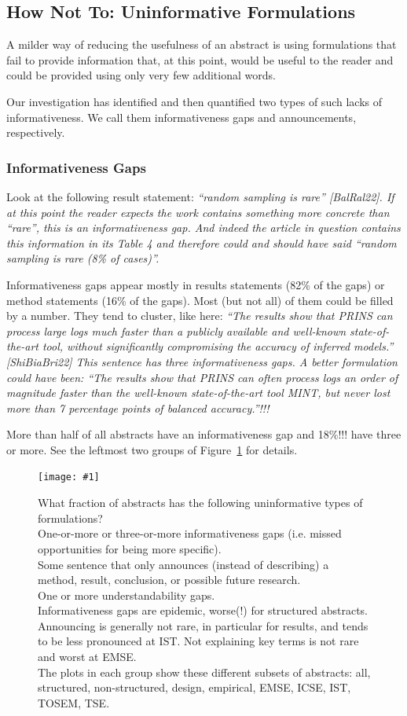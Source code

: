 \documentclass[10pt,journal,compsoc]{IEEEtran}
\newcommand{\Plotwide}[2]{%
	\begin{figure}[tbp]%
		\centering\texttt{[image: \#1]}%
		\vspace{-4mm}\caption{#2}\label{#1}%
    \end{figure}}
\newcommand{\Art}[1]{\bgroup[#1]\egroup} %
\newcommand{\Quote}[1]{\bgroup\itshape ``#1''\egroup}  %
\newcommand{\Pseudoquote}[1]{\bgroup\itshape ``#1''\egroup}  %
\newcommand{\Describegroups}{The plots in each group show these different subsets of abstracts:
	all, structured, non-structured, design, empirical, EMSE, ICSE, IST, TOSEM, TSE.}
\begin{document}
\subsection{How Not To: Uninformative Formulations}

A milder way of reducing the usefulness of an abstract is using formulations that
fail to provide information that, at this point, would be useful to the reader and
could be provided using only very few additional words.

Our investigation has identified and then quantified two types
of such lacks of informativeness.
We call them informativeness gaps and announcements, respectively.

\subsubsection{Informativeness Gaps}

Look at the following result statement:
\Quote{random sampling is rare} \Art{BalRal22}. %
If at this point the reader expects the work contains something more
concrete than \Quote{rare}, this is an informativeness gap.
And indeed the article in question contains this information in its
Table 4 and therefore could and should have said
\Pseudoquote{random sampling is rare (8\% of cases)}.

Informativeness gaps appear mostly in results statements (82\% of the gaps)
or method statements (16\% of the gaps).
Most (but not all) of them could be filled by a number.
They tend to cluster,
like here:
\Quote{The results show that PRINS can process large logs much faster
  than a publicly available and well-known state-of-the-art tool,
  without significantly compromising the accuracy of inferred models.} \Art{ShiBiaBri22} %
This sentence has three informativeness gaps.
A better formulation could have been:
\Pseudoquote{The results show that PRINS can often process logs an order of magnitude faster
  than the well-known state-of-the-art tool MINT,
  but never lost more than 7 percentage points of balanced accuracy.}!!!

More than half of all abstracts have an informativeness gap
and 18\%!!! have three or more.
See the leftmost two groups of Figure~\ref{nonzerofractionbar_xletgroups_missinginfofractions}
for details.

\Plotwide{nonzerofractionbar_xletgroups_missinginfofractions}{%
	What fraction of abstracts has the following uninformative types of formulations?\\
	One-or-more or three-or-more informativeness gaps (i.e. missed opportunities for being more specific).\\
	Some sentence that only announces (instead of describing) a method, result, conclusion, or
	possible future research.\\
	One or more understandability gaps.\\
	Informativeness gaps are epidemic, worse(!) for structured abstracts.
	Announcing is generally not rare, in particular for results, and tends to be less pronounced
	at IST.
	Not explaining key terms is not rare and worst at EMSE.\\
	\Describegroups}
\end{document}
